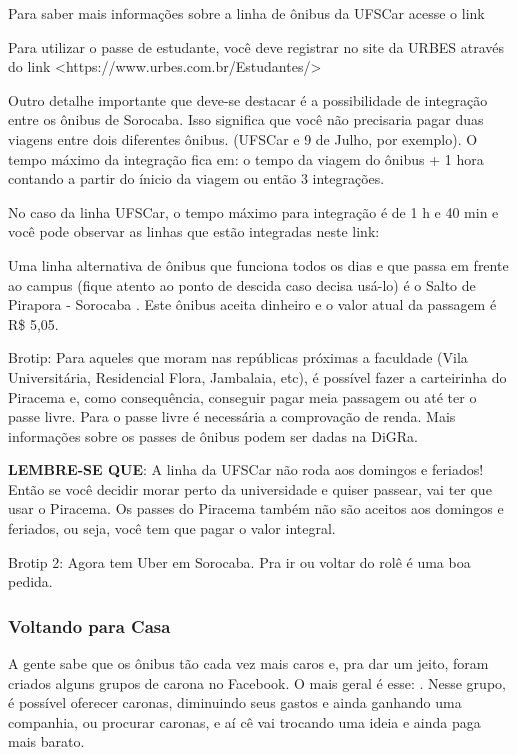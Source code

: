 Para saber mais informações sobre a linha de ônibus da UFSCar acesse o link 

Para utilizar o passe de estudante, você deve registrar no site da URBES através do link <https://www.urbes.com.br/Estudantes/>

Outro detalhe importante que deve-se destacar é a possibilidade de integração entre os ônibus de Sorocaba. Isso significa que você não precisaria pagar duas viagens entre dois diferentes ônibus. (UFSCar e 9 de Julho, por exemplo). O tempo máximo da integração fica em: o tempo da viagem do ônibus + 1 hora contando a partir do ínicio da viagem ou então 3 integrações.

No caso da linha UFSCar, o tempo máximo para integração é de 1 h e 40 min e você pode observar as linhas que estão integradas neste link: 

Uma linha alternativa de ônibus que funciona todos os dias e que passa em frente ao campus (fique atento ao ponto de descida caso decisa usá-lo) é o Salto de Pirapora - Sorocaba . Este ônibus aceita dinheiro e o valor atual da passagem é R\$ 5,05.

Brotip: Para aqueles que moram nas repúblicas próximas a faculdade (Vila Universitária, Residencial Flora, Jambalaia, etc), é possível fazer a carteirinha do Piracema e, como consequência, conseguir pagar meia passagem ou até ter o passe livre. Para o passe livre é necessária a comprovação de renda. Mais informações sobre os passes de ônibus podem ser dadas na DiGRa.

\textbf{LEMBRE-SE QUE}: A linha da UFSCar não roda aos domingos e feriados! Então se você decidir morar perto da universidade e quiser passear, vai ter que usar o Piracema. Os passes do Piracema também não são aceitos aos domingos e feriados, ou seja, você tem que pagar o valor integral.

Brotip 2: Agora tem Uber em Sorocaba. Pra ir ou voltar do rolê é uma boa pedida.

\subsubsection{Voltando para Casa}
A gente sabe que os ônibus tão cada vez mais caros e, pra dar um jeito, foram
criados alguns grupos de carona no Facebook. O mais geral é esse:
. Nesse grupo, é possível oferecer caronas, diminuindo seus gastos e ainda ganhando uma companhia, ou procurar caronas, e aí cê vai trocando uma ideia e ainda paga mais barato.

